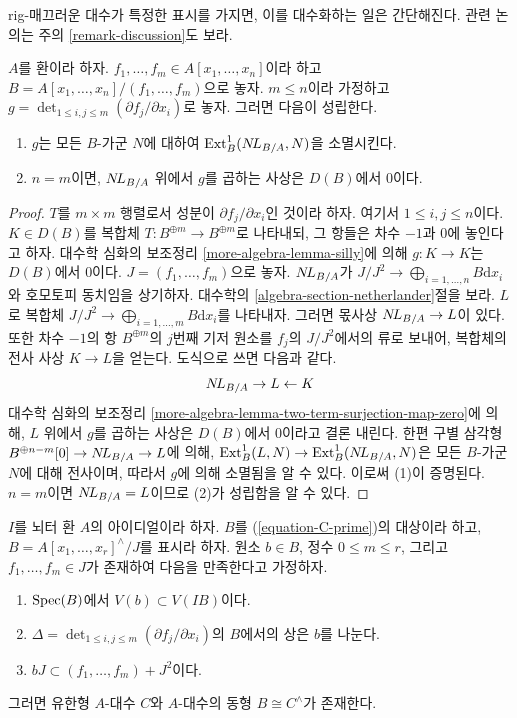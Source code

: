 \noindent
rig-매끄러운 대수가 특정한 표시를 가지면, 이를 대수화하는 일은 간단해진다.
관련 논의는 주의 \ref{remark-discussion}도 보라.

\begin{lemma}
\label{lemma-presentation-rig-smooth}
$A$를 환이라 하자. $f_1, \ldots, f_m \in A[x_1, \ldots, x_n]$이라 하고
$B = A[x_1, \ldots, x_n]/(f_1, \ldots, f_m)$으로 놓자.
$m \leq n$이라 가정하고 $g = \det_{1 \leq i, j \leq m}(\partial f_j/\partial x_i)$로 놓자.
그러면 다음이 성립한다.
\begin{enumerate}
\item $g$는 모든 $B$-가군 $N$에 대하여 $\mathop{\mathrm{Ext}}\nolimits^1_B(\mathop{N\!L}\nolimits_{B/A}, N)$을 소멸시킨다.
\item $n = m$이면, $\mathop{N\!L}\nolimits_{B/A}$ 위에서 $g$를 곱하는 사상은 $D(B)$에서 $0$이다.
\end{enumerate}
\end{lemma}

\begin{proof}
$T$를 $m \times m$ 행렬로서 성분이 $\partial f_j/\partial x_i$인 것이라 하자.
여기서 $1 \leq i, j \leq n$이다.
$K \in D(B)$를 복합체 $T : B^{\oplus m} \to B^{\oplus m}$로 나타내되,
그 항들은 차수 $-1$과 $0$에 놓인다고 하자.
대수학 심화의 보조정리 \ref{more-algebra-lemma-silly}에 의해
$g : K \to K$는 $D(B)$에서 0이다. $J = (f_1, \ldots, f_m)$으로 놓자.
$\mathop{N\!L}\nolimits_{B/A}$가 $J/J^2 \to \bigoplus_{i = 1, \ldots, n} B\text{d}x_i$와
호모토피 동치임을 상기하자. 대수학의 \ref{algebra-section-netherlander}절을 보라.
$L$로 복합체 $J/J^2 \to \bigoplus_{i = 1, \ldots, m} B\text{d}x_i$를 나타내자.
그러면 몫사상 $\mathop{N\!L}\nolimits_{B/A} \to L$이 있다.
또한 차수 $-1$의 항 $B^{\oplus m}$의 $j$번째 기저 원소를
$f_j$의 $J/J^2$에서의 류로 보내어, 복합체의 전사 사상 $K \to L$을 얻는다.
도식으로 쓰면 다음과 같다.
$$
\mathop{N\!L}\nolimits_{B/A} \to L \leftarrow K
$$
대수학 심화의 보조정리 \ref{more-algebra-lemma-two-term-surjection-map-zero}에 의해,
$L$ 위에서 $g$를 곱하는 사상은 $D(B)$에서 $0$이라고 결론 내린다.
한편 구별 삼각형 $B^{\oplus n - m}[0] \to \mathop{N\!L}\nolimits_{B/A} \to L$에 의해,
$\mathop{\mathrm{Ext}}\nolimits^1_B(L, N) \to \mathop{\mathrm{Ext}}\nolimits^1_B(\mathop{N\!L}\nolimits_{B/A}, N)$은 모든 $B$-가군 $N$에 대해 전사이며,
따라서 $g$에 의해 소멸됨을 알 수 있다. 이로써 (1)이 증명된다.
$n = m$이면 $\mathop{N\!L}\nolimits_{B/A} = L$이므로 (2)가 성립함을 알 수 있다.
\end{proof}

\begin{lemma}
\label{lemma-approximate-presentation-rig-smooth}
$I$를 뇌터 환 $A$의 아이디얼이라 하자.
$B$를 (\ref{equation-C-prime})의 대상이라 하고,
$B = A[x_1, \ldots, x_r]^\wedge/J$를 표시라 하자.
원소 $b \in B$, 정수 $0 \leq m \leq r$, 그리고 $f_1, \ldots, f_m \in J$가
존재하여 다음을 만족한다고 가정하자.
\begin{enumerate}
\item $\mathop{\mathrm{Spec}}(B)$에서 $V(b) \subset V(IB)$이다.
\item $\Delta = \det_{1 \leq i, j \leq m}(\partial f_j/\partial x_i)$의
$B$에서의 상은 $b$를 나눈다.
\item $b J \subset (f_1, \ldots, f_m) + J^2$이다.
\end{enumerate}
그러면 유한형 $A$-대수 $C$와 $A$-대수의 동형 $B \cong C^\wedge$가 존재한다.
\end{lemma}

